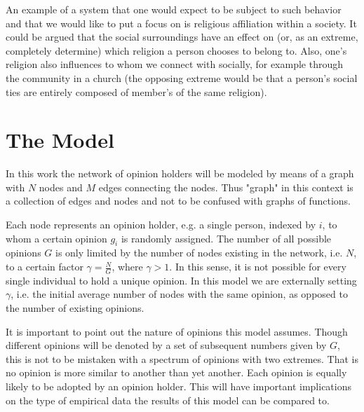 \documentclass[11pt]{article}
\begin{document}
An example of a system that one would expect to be subject to such behavior and that we would like to put a focus on is religious affiliation within a society. It could be argued that the social surroundings have an effect on (or, as an extreme, completely determine) which religion a person chooses to belong to. Also, one's religion also influences to whom we connect with socially, for example through the community in a church (the opposing extreme would be that a person's social ties are entirely composed of member's of the same religion). 



\section{The Model}

In this work the network of opinion holders will be modeled by means of a graph with $N$ nodes and $M$ edges connecting the nodes. Thus "graph" in this context is a collection of edges and nodes and not to be confused with graphs of functions. 

Each node represents an opinion holder, e.g. a  single person, indexed by $i$, to whom a certain opinion $g_i$ is randomly assigned. The number of all possible opinions $G$ is only limited by the number of nodes existing in the network, i.e. $N$, to a certain factor $\gamma = \frac{N}{G}$, where $\gamma > 1$. In this sense, it is not possible for every single individual to hold a unique opinion. In this model we are externally setting $\gamma$, i.e. the initial average number of nodes with the same opinion, as opposed to the number of existing opinions. 

It is important to point out the nature of opinions this model assumes. Though different opinions will be denoted by a set of subsequent numbers given by $G$, this is not to be mistaken with a spectrum of opinions with two extremes. That is no opinion is more similar to another than yet another. Each opinion is equally likely to be adopted by an opinion holder. This will have important implications on the type of empirical data the results of this model can be compared to.
\end{document}
